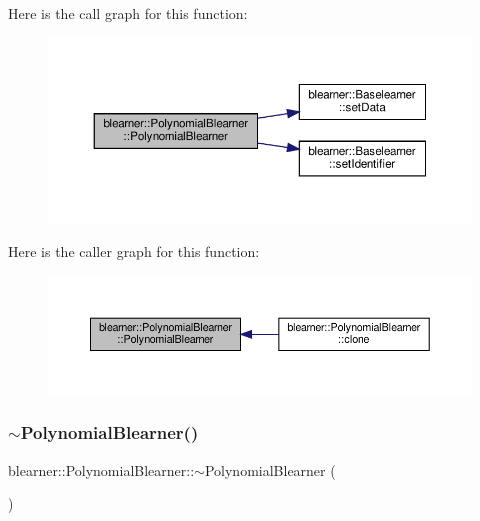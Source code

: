 Here is the call graph for this function\+:\nopagebreak
\begin{figure}[H]
\begin{center}
\leavevmode
\includegraphics[width=350pt]{classblearner_1_1_polynomial_blearner_abc12720faabbad27d60d2dbdb006802e_cgraph}
\end{center}
\end{figure}
Here is the caller graph for this function\+:\nopagebreak
\begin{figure}[H]
\begin{center}
\leavevmode
\includegraphics[width=350pt]{classblearner_1_1_polynomial_blearner_abc12720faabbad27d60d2dbdb006802e_icgraph}
\end{center}
\end{figure}
\mbox{\label{classblearner_1_1_polynomial_blearner_ac3acf16e62db3dc6c34b4290f9f04f04}} 
\subsubsection{\texorpdfstring{$\sim$\+Polynomial\+Blearner()}{~PolynomialBlearner()}}
{\footnotesize\ttfamily blearner\+::\+Polynomial\+Blearner\+::$\sim$\+Polynomial\+Blearner (\begin{DoxyParamCaption}{ }\end{DoxyParamCaption})}



